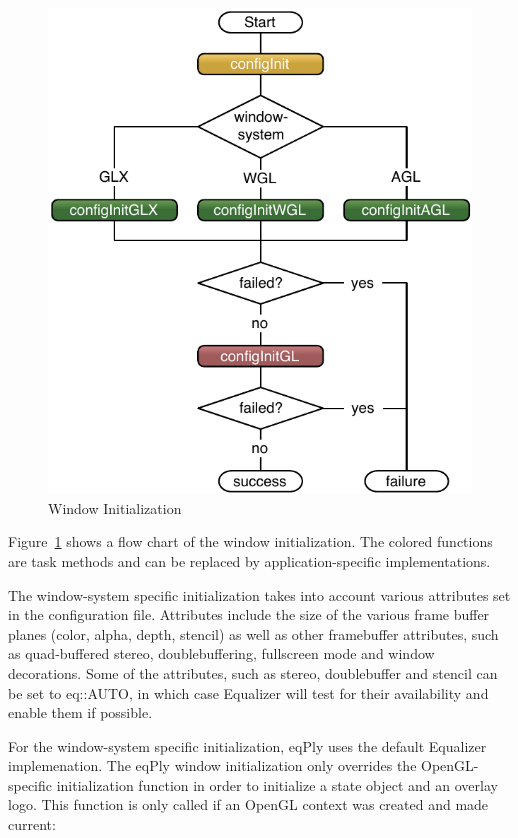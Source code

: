\documentclass[10pt,a4]{scrartcl}
\newcommand{\fig}[1]{Figure~\ref{#1}}
\begin{document}
\begin{figure}
  \includegraphics[width=.618\textwidth]{images/windowInit.pdf}
  {\caption{\small\label{fWindowInit}Window Initialization}}
\end{figure}
\fig{fWindowInit} shows a flow chart of the window initialization. The
colored functions are task methods and can be replaced by
application-specific implementations.

The window-system specific initialization takes into account various
attributes set in the configuration file. Attributes include the size of
the various frame buffer planes  (color, alpha, depth, stencil) as well
as other framebuffer attributes, such as quad-buffered stereo,
doublebuffering, fullscreen mode and window decorations. Some of the
attributes, such as stereo, doublebuffer and stencil can be set to
\textsf{eq::AUTO}, in which case Equalizer will test for their availability and 
enable them if possible.

For the window-system specific initialization, \textsf{eqPly} uses the
default Equalizer implemenation. The \textsf{eqPly} window
initialization only overrides the OpenGL-specific initialization
function in order to initialize a state object and an overlay logo. This
function is only called if an OpenGL context was created and made current:
\end{document}
